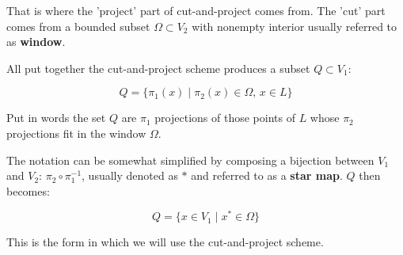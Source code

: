 \documentclass[text.tex]{subfiles}
\begin{document}
That is where the 'project' part of cut-and-project comes from. The 'cut' part comes from a bounded subset $\Omega\subset V_2$ with nonempty interior usually referred to as \textbf{window}. 

All put together the cut-and-project scheme produces a subset $Q\subset V_1$:

$$Q = \{ \pi_1(x)\; |\; \pi_2(x)\in \Omega,\,  x\in L \}$$

Put in words the set $Q$ are $\pi_1$ projections of those points of $L$ whose $\pi_2$ projections fit in the window $\Omega$. 

The notation can be somewhat simplified by composing a bijection between $V_1$ and $V_2$: $\pi_2\circ\pi^{-1}_1$, usually denoted as $\ast$ and referred to as a \textbf{star map}. $Q$ then becomes:

$$Q = \{ x \in V_1\; |\; x^\ast\in \Omega \}$$

This is the form in which we will use the cut-and-project scheme. 
\end{document}
